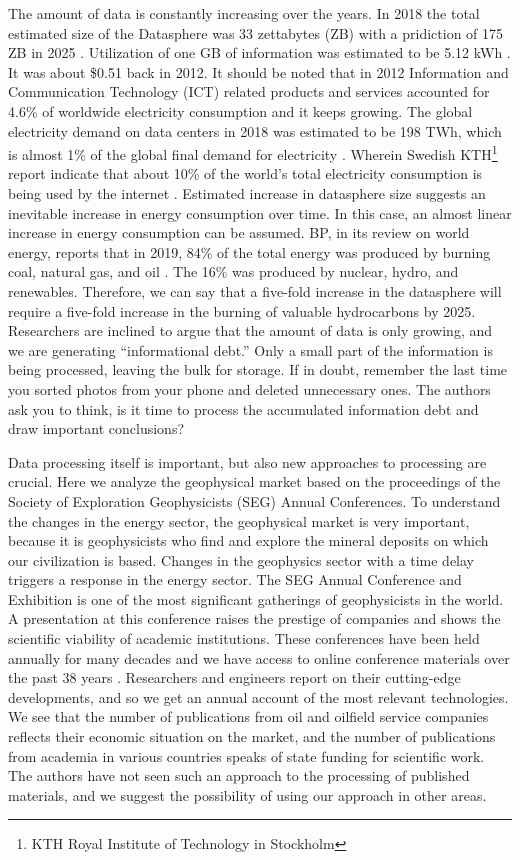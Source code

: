 \documentclass[energies,article,submit,moreauthors,pdftex]{Definitions/mdpi}
\begin{document}
The amount of data is constantly increasing over the years. In 2018 the total estimated size of the Datasphere was 33 zettabytes (ZB) with a pridiction of 175 ZB in 2025 \citep{Reinsel2018}. Utilization of one GB of information was estimated to be 5.12 kWh \citep{Costenaro2012}. It was about \$0.51 back in 2012. It should be noted that in 2012 Information and Communication Technology (ICT) related products and services accounted for 4.6\% of worldwide electricity consumption \citep{Heddeghem2014} and it keeps growing. The global electricity demand on data centers in 2018 was estimated to be 198 TWh, which is almost 1\% of the global final demand for electricity \citep{Dulac2019}. Wherein Swedish KTH\footnote{KTH Royal Institute of Technology in Stockholm} report indicate that  about  10\% of the world’s total electricity consumption is being used by the internet \citep{KTH2019}. Estimated increase in datasphere size suggests an inevitable increase in energy consumption over time. In this case, an almost linear increase in energy consumption can be assumed. BP, in  its review on world energy, reports that in 2019, 84\% of the total energy was produced by burning coal, natural gas, and oil \citep{BP2019}. The 16\% was produced by nuclear, hydro, and renewables. Therefore, we can say that a five-fold increase in the datasphere will require a five-fold increase in the burning of valuable hydrocarbons by 2025. Researchers are inclined to argue that the amount of data is only growing, and we are generating ``informational debt.'' Only a small part of the information is being processed, leaving the bulk for storage. If in doubt, remember the last time you sorted photos from your phone and deleted unnecessary ones. The authors ask you to think, is it time to process the accumulated information debt and draw important conclusions?

Data processing itself is important, but also new approaches to processing are crucial. Here we analyze the geophysical market based on the proceedings of the Society of Exploration Geophysicists (SEG) Annual Conferences. To understand the changes in the energy sector, the geophysical market is very important, because it is geophysicists who find and explore the mineral deposits on which our civilization is based. Changes in the geophysics sector with a time delay triggers a response in the energy sector. The SEG Annual Conference and Exhibition is one of the most significant gatherings of geophysicists in the world. A presentation at this conference raises the prestige of companies and shows the scientific viability of academic institutions. These conferences have been held annually for many decades and we have access to online conference materials over the past 38 years \citep{SEG}. Researchers and engineers report on their cutting-edge developments, and so we get an annual account of the most relevant technologies. We see that the number of publications from oil and oilfield service companies reflects their economic situation on the market, and the number of publications from academia in various countries speaks of state funding for scientific work. The authors have not seen such an approach to the processing of published materials, and we suggest the possibility of using our approach in other areas. 
\end{document}

